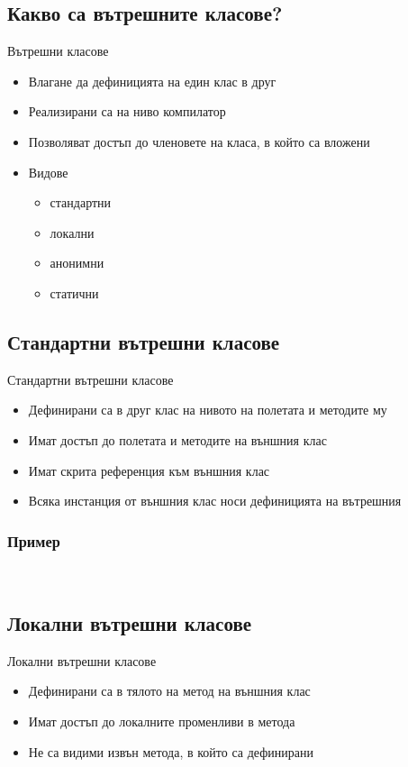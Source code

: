\documentclass{beamer}
\begin{document}
\subsection{Какво са вътрешните класове?}
\begin{frame}{Вътрешни класове}
  \transdissolve
  \begin{itemize}
  \item Влагане да дефиницията на един клас в друг
  \item Реализирани са на ниво компилатор
  \item Позволяват достъп до членовете на класа, в който са вложени
  \item Видове
    \begin{itemize}
      \item стандартни
      \item локални 
      \item анонимни
      \item статични
    \end{itemize}

  \end{itemize}
\end{frame}

\subsection{Стандартни вътрешни класове}
\begin{frame}{Стандартни вътрешни класове}
  \transdissolve
  \begin{itemize}
  \item Дефинирани са в друг клас на нивото на полетата и методите му
  \item Имат достъп до полетата и методите на външния клас
  \item Имат скрита референция към външния клас
  \item Всяка инстанция от външния клас носи дефиницията на вътрешния
  \end{itemize}
\end{frame}

\begin{frame}[fragile]
  \frametitle{Пример}
  \transdissolve
\begin{lstlisting}
  
\end{lstlisting}
\end{frame}

\subsection{Локални вътрешни класове}
\begin{frame}{Локални вътрешни класове}
  \transdissolve
  \begin{itemize}
  \item Дефинирани са в тялото на метод на външния клас
  \item Имат достъп до локалните променливи в метода
  \item Не са видими извън метода, в който са дефинирани
  \end{itemize}
\end{frame}
\end{document}
